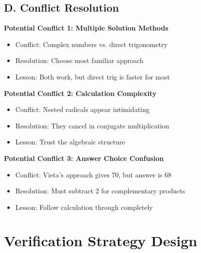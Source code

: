 \documentclass[12pt]{article}
\begin{document}
\begin{techniquesbox}
\subsection*{D. Conflict Resolution}

\textbf{Potential Conflict 1: Multiple Solution Methods}
\begin{itemize}
    \item Conflict: Complex numbers vs. direct trigonometry
    \item Resolution: Choose most familiar approach
    \item Lesson: Both work, but direct trig is faster for most
\end{itemize}

\textbf{Potential Conflict 2: Calculation Complexity}
\begin{itemize}
    \item Conflict: Nested radicals appear intimidating
    \item Resolution: They cancel in conjugate multiplication
    \item Lesson: Trust the algebraic structure
\end{itemize}

\textbf{Potential Conflict 3: Answer Choice Confusion}
\begin{itemize}
    \item Conflict: Vieta's approach gives 70, but answer is 68
    \item Resolution: Must subtract 2 for complementary products
    \item Lesson: Follow calculation through completely
\end{itemize}

\end{techniquesbox}

\section{Verification Strategy Design}
\end{document}
